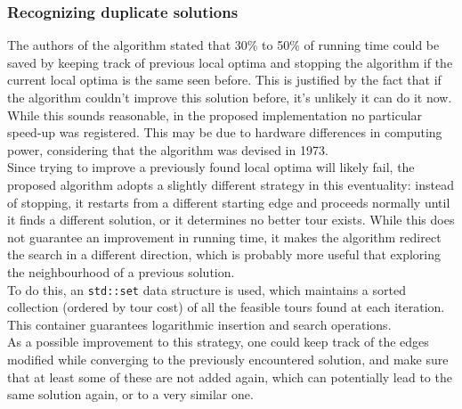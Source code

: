 \subsubsection{Recognizing duplicate solutions}
The authors of the algorithm stated that 30\% to 50\% of running time could be saved by keeping track of previous local optima and stopping the algorithm if the current local optima is the same seen before. This is justified by the fact that if the algorithm couldn't improve this solution before, it's unlikely it can do it now. While this sounds reasonable, in the proposed implementation no particular speed-up was registered. This may be due to hardware differences in computing power, considering that the algorithm was devised in 1973.\\
Since trying to improve a previously found local optima will likely fail, the proposed algorithm adopts a slightly different strategy in this eventuality: instead of stopping, it restarts from a different starting edge and proceeds normally until it finds a different solution, or it determines no better tour exists. While this does not guarantee an improvement in running time, it makes the algorithm redirect the search in a different direction, which is probably more useful that exploring the neighbourhood of a previous solution.\\
To do this, an \texttt{std::set} data structure is used, which maintains a sorted collection (ordered by tour cost) of all the feasible tours found at each iteration. This container guarantees logarithmic insertion and search operations.\\
As a possible improvement to this strategy, one could keep track of the edges modified while converging to the previously encountered solution, and make sure that at least some of these are not added again, which can potentially lead to the same solution again, or to a very similar one.

